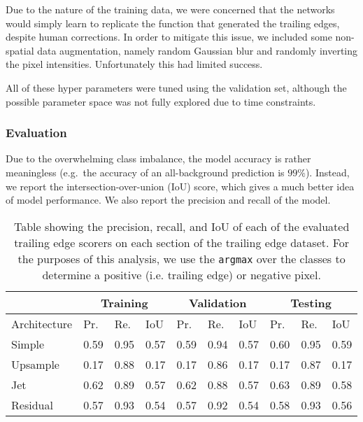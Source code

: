 Due to the nature of the training data, we were concerned that the networks would simply learn to replicate the function that generated the trailing edges, despite human corrections.
In order to mitigate this issue, we included some non-spatial data augmentation, namely random Gaussian blur and randomly inverting the pixel intensities.
Unfortunately this had limited success.


All of these hyper parameters were tuned using the validation set, although the possible parameter space was not fully explored due to time constraints.

\subsubsection{Evaluation}

Due to the overwhelming class imbalance, the model accuracy is rather meaningless (e.g.\ the accuracy of an all-background prediction is $99\%$).
Instead, we report the intersection-over-union (IoU) score, which gives a much better idea of model performance.
We also report the precision and recall of the model.



\begin{table*}[!htb]%
	\centering
	\resizebox{\linewidth}{!}
	{
		\begin{tabular} {l || l | l | l || l | l | l || l | l | l |}
		& \multicolumn{3}{c||}{Training} & \multicolumn{3}{c||}{Validation} & \multicolumn{3}{c|}{Testing} \\
		\hline
		Architecture & Pr. & Re. & IoU & Pr. & Re. & IoU & Pr. & Re. & IoU \\
		\hhline{=#===#===#===|}
		Simple & 0.59 & 0.95 & 0.57 & 0.59 & 0.94 & 0.57 & 0.60 & 0.95 & 0.59 \\
		\hline
		Upsample & 0.17 & 0.88 & 0.17 & 0.17 & 0.86 & 0.17 & 0.17 & 0.87 & 0.17 \\
		\hline
		Jet & 0.62 & 0.89 & 0.57 & 0.62 & 0.88 & 0.57 & 0.63 & 0.89 & 0.58 \\
		\hline
		Residual & 0.57 & 0.93 & 0.54 & 0.57 & 0.92 & 0.54 & 0.58 & 0.93 & 0.56 \\
		\hline
		\end{tabular}
	}
	\caption{Table showing the precision, recall, and IoU of each of the evaluated trailing edge scorers on each section of the trailing edge dataset. For the purposes of this analysis, we use the \texttt{argmax} over the classes to determine a positive (i.e. trailing edge) or negative pixel.}
	\label{tab:te_score_full_analysis}
\end{table*}

